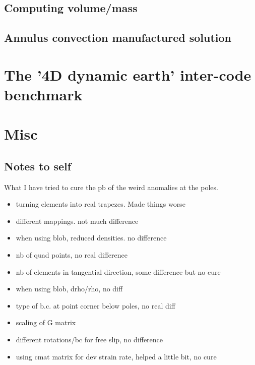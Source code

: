 \documentclass[a4paper,12pt]{article}
\begin{document}
\subsection{Computing volume/mass}


\subsection{Annulus convection manufactured solution}


\section{The '4D dynamic earth' inter-code benchmark}

\cite{krhb12}


\newpage
\appendix
\section{Misc}

\subsection{Notes to self}

What I have tried to cure the pb of the weird anomalies at the poles.

\begin{itemize}
\item turning elements into real trapezes. Made things worse
\item different mappings. not much difference
\item when using blob, reduced densities. no difference
\item nb of quad points, no real difference
\item nb of elements in tangential direction, some difference but no cure 
\item when using blob, drho/rho, no diff 
\item type of b.c. at point corner below poles, no real diff 
\item scaling of G matrix
\item different rotations/bc for free slip, no difference
\item using cmat matrix for dev strain rate, helped a little bit, no cure 
\end{itemize}
\end{document}
